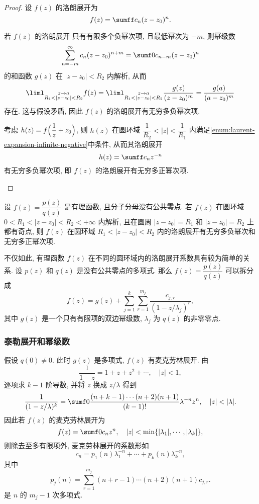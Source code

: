 \begin{proof}
  设 $f(z)$ 的洛朗展开为
  \[
    f(z)=\sumff c_n(z-z_0)^n.
  \]
  \vspace{-\baselineskip}
  \begin{enumpar}
    \item 若 $f(z)$ 的洛朗展开
    只有有限多个负幂次项, 且最低幂次为 $-m$, 则幂级数
      \[
         \sum_{n=-m}^\infty c_n(z-z_0)^{n+m}
        =\sumf0 c_{n-m}(z-z_0)^n
      \]
      的和函数 $g(z)$ 在 $|z-z_0|<R_2$ 内解析, 从而
      \[
        \liml_{\substack{z\ra a\\R_1<|z-z_0|<R_2}} f(z)
        =\liml_{\substack{z\ra a\\R_1<|z-z_0|<R_2}} \frac{g(z)}{(z-z_0)^m}
        =\frac{g(a)}{(a-z_0)^m}
      \]
      存在.
      这与假设矛盾, 因此 $f(z)$ 的洛朗展开有无穷多负幂次项.
    \item 考虑 $h(z)=f\Bigl(\dfrac1z+z_0\Bigr)$, 则 $h(z)$ 在圆环域 $\dfrac 1{R_2}<|z|<\dfrac 1{R_1}$ 内满足\ref{enum:laurent-expansion-infinite-negative}中条件, 从而其洛朗展开
      \[
        h(z)=\sumff c_nz^{-n}
      \]
      有无穷多负幂次项, 即 $f(z)$ 的洛朗展开有无穷多正幂次项.
      \qedhere
  \end{enumpar}
\end{proof}

\begin{example}
  设 $f(z)=\dfrac{p(z)}{q(z)}$ 是有理函数, 且分子分母没有公共零点.
  若 $f(z)$ 在圆环域 $0<R_1<|z-z_0|<R_2<+\infty$ 内解析, 且在圆周 $|z-z_0|=R_1$ 和 $|z-z_0|=R_2$ 上都有奇点, 则 $f(z)$ 在圆环域 $R_1<|z-z_0|<R_2$ 内的洛朗展开有无穷多负幂次和无穷多正幂次项.
\end{example}

不仅如此, 有理函数 $f(z)$ 在不同的圆环域内的洛朗展开系数具有较为简单的关系.
设 $p(z)$ 和 $q(z)$ 是没有公共零点的多项式.
那么 $f(z)=\dfrac{p(z)}{q(z)}$ 可以拆分成
\[
  f(z)=g(z)+\sum_{j=1}^k \sum_{r=1}^{m_j} \frac{c_{j,r}}{(1-z/\lambda_j)^r},
\]
其中 $g(z)$ 是一个只有有限项的双边幂级数, $\lambda_j$ 为 $q(z)$ 的非零零点.


\subsubsection{泰勒展开和幂级数}

假设 $q(0)\neq 0$.
此时 $g(z)$ 是多项式, $f(z)$ 有麦克劳林展开.
由
\[
  \frac1{1-z}=1+z+z^2+\cdots,\quad |z|<1,
\]
逐项求 $k-1$ 阶导数, 并将 $z$ 换成 $z/\lambda$ 得到
\[
   \frac1{(1-z/\lambda)^k}
  =\sumf0 \frac{(n+k-1)\cdots(n+2)(n+1)}{(k-1)!}\lambda^{-n}z^n,\quad |z|<|\lambda|.
\]
因此若 $f(z)$ 的麦克劳林展开为
\[
  f(z)=\sumf0 c_n z^n,\quad |z|<\min\{|\lambda_1|,\cdots,|\lambda_k|\},
\]
则除去至多有限项外, 麦克劳林展开的系数形如
\[
  c_n=p_1(n)\lambda_1^{-n}+\cdots+p_k(n)\lambda_k^{-n},
\]
其中
\[
  p_j(n)=\sum_{r=1}^{m_j} (n+r-1)\cdots(n+2)(n+1)c_{j,r}.
\]
是 $n$ 的 $m_j-1$ 次多项式.

